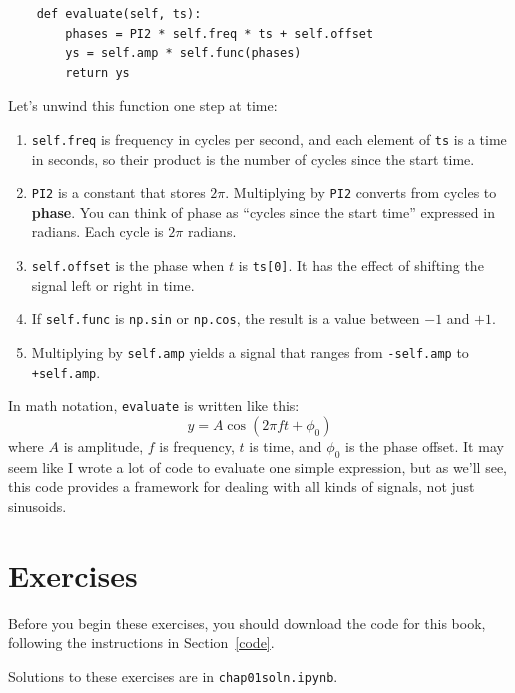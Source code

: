\documentclass[12pt]{book}
\begin{document}
\begin{verbatim}
    def evaluate(self, ts):
        phases = PI2 * self.freq * ts + self.offset
        ys = self.amp * self.func(phases)
        return ys
\end{verbatim}

Let's unwind this function one step at time:

\begin{enumerate}

\item {\tt self.freq} is frequency in cycles per second, and each
  element of {\tt ts} is a time in seconds, so their product is the
  number of cycles since the start time.

\item {\tt PI2} is a constant that stores $2 \pi$.  Multiplying by
  {\tt PI2} converts from cycles to {\bf phase}.  You can think of
  phase as ``cycles since the start time'' expressed in radians.  Each
  cycle is $2 \pi$ radians.

\item {\tt self.offset} is the phase when $t$ is {\tt ts[0]}.
  It has the effect of shifting the signal left or right in time.

\item If {\tt self.func} is {\tt np.sin} or {\tt np.cos}, the result is a
  value between $-1$ and $+1$.

\item Multiplying by {\tt self.amp} yields a signal that ranges from
  {\tt -self.amp} to {\tt +self.amp}.

\end{enumerate}

In math notation, {\tt evaluate} is written like this:
%
\[ y = A \cos (2 \pi f t + \phi_0) \]
%
where $A$ is amplitude, $f$ is frequency, $t$ is time, and $\phi_0$
is the phase offset.  It may seem like I wrote a lot of code
to evaluate one simple expression, but as we'll see, this code
provides a framework for dealing with all kinds of signals, not
just sinusoids.


\section{Exercises}

Before you begin these exercises, you should download the code
for this book, following the instructions in Section~\ref{code}.

Solutions to these exercises are in {\tt chap01soln.ipynb}.
\end{document}

